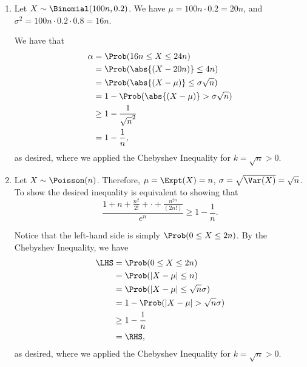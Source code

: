 \Question{\currfilebase}

\begin{enumerate}
    \item Let \(X \sim \Binomial(100n, 0.2)\). We have \(\mu = 100n \cdot 0.2 = 20n\), and \(\sigma^2 = 100n \cdot 0.2 \cdot 0.8 = 16n\).

          We have that
          \begin{align*}
              \alpha & = \Prob(16n \leq X \leq 24n)                  \\
                     & = \Prob(\abs{(X - 20n)} \leq 4n)              \\
                     & = \Prob(\abs{(X - \mu)} \leq \sigma \sqrt n)  \\
                     & = 1 - \Prob(\abs{(X - \mu)} > \sigma \sqrt n) \\
                     & \geq 1 - \frac{1}{\sqrt{n}^2}                 \\
                     & = 1 - \frac{1}{n},
          \end{align*}
          as desired, where we applied the Chebyshev Inequality for \(k = \sqrt{n} > 0\).

    \item Let \(X \sim \Poisson(n)\). Therefore, \(\mu = \Expt(X) = n\), \(\sigma = \sqrt{\Var(X)} = \sqrt{n}\). To show the desired inequality is equivalent to showing that
          \[
              \frac{1 + n + \frac{n^2}{2!} + \cdot + \frac{n^{2n}}{(2n!)}}{e^n} \geq 1 - \frac{1}{n}.
          \]

          Notice that the left-hand side is simply \(\Prob(0 \leq X \leq 2n)\). By the Chebyshev Inequality, we have
          \begin{align*}
              \LHS & = \Prob(0 \leq X \leq 2n)                \\
                   & = \Prob(|X - \mu| \leq n)                \\
                   & = \Prob(|X - \mu| \leq \sqrt{n} \sigma)  \\
                   & = 1 - \Prob(|X - \mu| > \sqrt{n} \sigma) \\
                   & \geq 1 - \frac{1}{n}                     \\
                   & = \RHS,
          \end{align*}
          as desired, where we applied the Chebyshev Inequality for \(k = \sqrt{n} > 0\).
\end{enumerate}